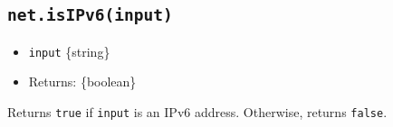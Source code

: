 \begin{Shaded}
\begin{Highlighting}[]
\NormalTok{(}\NormalTok{)}\OperatorTok{;} 
\NormalTok{(}\NormalTok{)}\OperatorTok{;} 
\NormalTok{(}\NormalTok{)}\OperatorTok{;} 
\NormalTok{(}\NormalTok{)}\OperatorTok{;} 
\end{Highlighting}
\end{Shaded}

\subsection{\texorpdfstring{\texttt{net.isIPv6(input)}}{net.isIPv6(input)}}\label{net.isipv6input}

\begin{itemize}
\tightlist
\item
  \texttt{input} \{string\}
\item
  Returns: \{boolean\}
\end{itemize}

Returns \texttt{true} if \texttt{input} is an IPv6 address. Otherwise,
returns \texttt{false}.

\begin{Shaded}
\begin{Highlighting}[]
\NormalTok{(}\StringTok{\textquotesingle{}::1\textquotesingle{}}\NormalTok{)}\OperatorTok{;} 
\NormalTok{(}\NormalTok{)}\OperatorTok{;} 
\end{Highlighting}
\end{Shaded}
